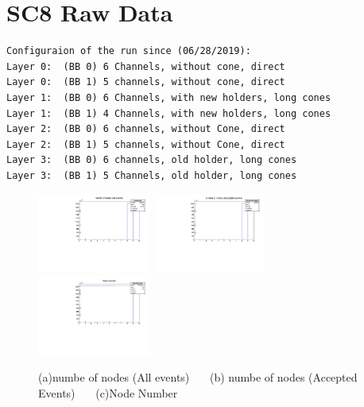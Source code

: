 \documentclass[a4paper,11pt]{article}
\theoremstyle{mytheor}
\begin{document}
\section{SC8 Raw Data} 
\begin{verbatim} 
Configuraion of the run since (06/28/2019): 
Layer 0:  (BB 0) 6 Channels, without cone, direct 
Layer 0:  (BB 1) 5 channels, without cone, direct 
Layer 1:  (BB 0) 6 Channels, with new holders, long cones 
Layer 1:  (BB 1) 4 Channels, with new holders, long cones 
Layer 2:  (BB 0) 6 channels, without Cone, direct 
Layer 2:  (BB 1) 5 channels, without Cone, direct 
Layer 3:  (BB 0) 6 channels, old holder, long cones 
Layer 3:  (BB 1) 5 Channels, old holder, long cones 
\end{verbatim} 
\begin{figure}[H] 
\vspace*{-0.3cm} 
\includegraphics[width=0.33\textwidth,scale=0.5,trim=0 0 0 0,clip]{plotsdir/file0_test-nNodesAll-1.pdf} 
\includegraphics[width=0.33\textwidth,scale=0.5,trim=0 0 0 0,clip]{plotsdir/file0_test-nNodesAccepted-1.pdf} 
\includegraphics[width=0.33\textwidth,scale=0.5,trim=0 0 0 0,clip]{plotsdir/file0_test-NodeNumber-1.pdf} 
\caption{(a)numbe of nodes (All events) ~~~(b) numbe of nodes (Accepted Events) ~~~(c)Node Number } 
\end{figure} 
\end{document}

